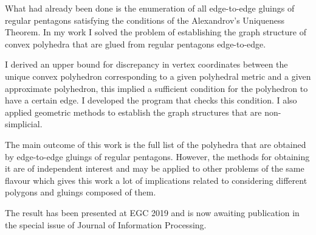 \documentclass[a4paper,11pt]{article}
\theoremstyle{definition}
\begin{document}
What had already been done is the enumeration of all edge-to-edge gluings of regular pentagons satisfying the conditions of the Alexandrov's Uniqueness Theorem. In my work I solved the problem of establishing the graph structure of convex polyhedra that are glued from regular pentagons edge-to-edge.

I derived an upper bound for discrepancy in vertex coordinates between the unique convex polyhedron corresponding to a given polyhedral metric and a given approximate polyhedron, this implied a sufficient condition for the polyhedron to have a certain edge. I developed the program that checks this condition. I also applied geometric methods to establish the graph structures that are non-simplicial.

The main outcome of this work is the full list of the polyhedra that are obtained by edge-to-edge gluings of regular pentagons. However, the methods for obtaining it are of independent interest and may be applied to other problems of the same flavour which gives this work a lot of implications related to considering different polygons and gluings composed of them.

The result has been presented at EGC 2019 and is now awaiting publication in the special issue of Journal of Information Processing.



\end{document}
